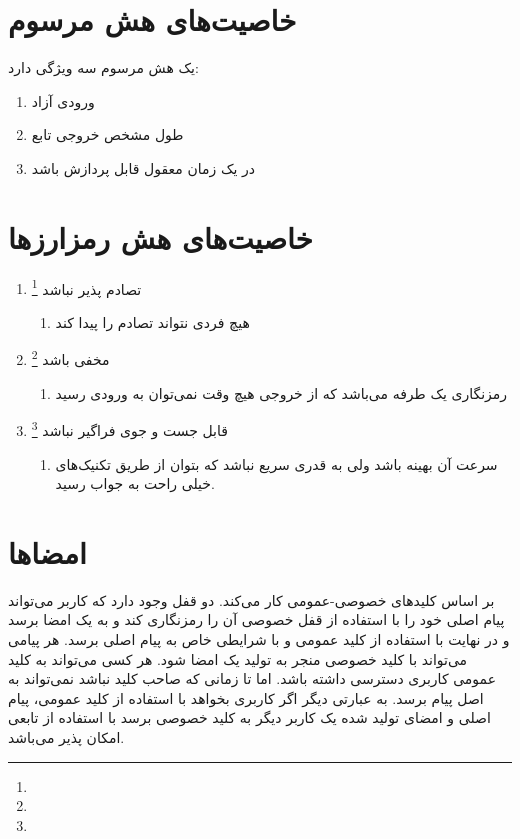 \documentclass[10pt, a4paper]{article}
\begin{document}
\section{خاصیت‌های هش مرسوم}

یک هش مرسوم سه ویژگی دارد:

\begin{enumerate}
    \item ورودی آزاد
    \item طول مشخص خروجی تابع
    \item در یک زمان معقول قابل پردازش باشد 
\end{enumerate}

\section{خاصیت‌های هش رمزارز‌ها}

\begin{enumerate}
    \item تصادم پذیر نباشد \footnote{}
    \begin{enumerate}
        \item هیچ فردی نتواند تصادم را پیدا کند
    \end{enumerate} 
    \item مخفی باشد \footnote{}
    \begin{enumerate}
        \item رمزنگاری یک طرفه می‌باشد که از خروجی هیچ وقت نمی‌توان به ورودی
        رسید
    \end{enumerate} 
    \item قابل جست و جوی فراگیر نباشد \footnote{}
    \begin{enumerate}
        \item سرعت آن بهینه باشد ولی به قدری سریع نباشد که بتوان از طریق
        تکنیک‌های  خیلی راحت به جواب رسید.
    \end{enumerate}
\end{enumerate}

\section{امضا‌ها}

بر اساس کلید‌های خصوصی-عمومی کار می‌کند.  دو قفل وجود دارد که کاربر می‌تواند
پیام اصلی خود را با استفاده از قفل خصوصی آن را رمزنگاری کند و به یک امضا برسد و
در نهایت با استفاده از کلید عمومی و با شرایطی خاص به پیام اصلی برسد.  هر پیامی
می‌تواند با کلید خصوصی منجر به تولید یک امضا شود. هر کسی می‌تواند به کلید عمومی
کاربری دسترسی داشته باشد. اما تا زمانی که صاحب کلید نباشد نمی‌تواند به اصل پیام
برسد. به عبارتی دیگر اگر کاربری بخواهد با استفاده از کلید عمومی، پیام اصلی و
امضای تولید شده یک کاربر دیگر به کلید خصوصی برسد با استفاده از تابعی امکان پذیر
می‌باشد. 
\end{document}
